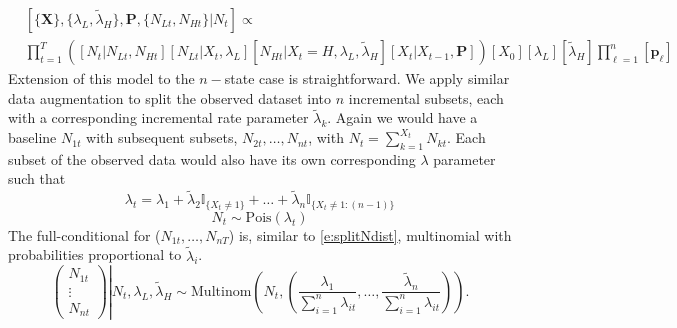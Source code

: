 \documentclass[smallextended]{svjour3}       %
\begin{document}
\begin{equation}
\begin{aligned}
&[\{\mathbf{X}\}, \{\lambda_L, \tilde{\lambda}_H\}, \mathbf{P}, \{N_{Lt}, N_{Ht}\} | N_t  ] \propto \\
&\prod_{t = 1}^T \left( [N_t | N_{Lt}, N_{Ht}] [N_{Lt} | X_t, \lambda_L] [N_{Ht} | X_t = H, \lambda_L, \tilde{\lambda}_H][X_t | X_{t-1}, \mathbf{P}] \right) [X_0][\lambda_L] [\tilde{\lambda}_H] \prod^n_{\ell = 1}[\mathbf{p}_\ell]
\end{aligned}
\end{equation}
Extension of this model to the $n-$state case is straightforward. We apply similar data augmentation to split the observed dataset into $n$ incremental subsets, each with a corresponding incremental rate parameter $\tilde{\lambda}_k$. Again we would have a baseline $N_{1t}$ with subsequent subsets, $N_{2t}, \dots, N_{nt}$, with $N_t = \sum^{X_t}_{k = 1} N_{kt}$. Each subset of the observed data would also have its own corresponding $\lambda$ parameter such that
\begin{equation}
\lambda_t = \lambda_1 + \tilde{\lambda}_{2}\mathbb{I}_{\{X_t \neq 1\}} + \dots + \tilde{\lambda}_n \mathbb{I}_{\{X_t \neq 1:(n-1) \}}
\end{equation}
\begin{equation}
N_t \sim \text{Pois}(\lambda_{t})
\end{equation}
The full-conditional for ($N_{1t}, \dots, N_{nT}$) is, similar to \eqref{e:splitNdist}, multinomial with probabilities proportional to $\tilde{\lambda}_i$.
\begin{equation}
\left. \begin{pmatrix}
    	N_{1t}\\
        \vdots\\
        N_{nt}
    	\end{pmatrix} \right| N_t, \lambda_L, \tilde{\lambda}_H  \sim 
\text{Multinom}\left(N_t,  \left(\frac{\lambda_1}{\sum_{i=1}^{n}\lambda_{it}},
\dots,
\frac{\tilde{\lambda}_n}{\sum_{i=1}^{n}\lambda_{it}}\right)\right).
\end{equation}
\end{document}
